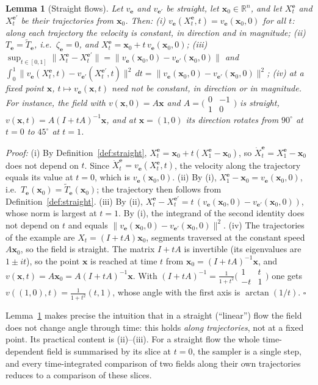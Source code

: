 \documentclass{article}
\newcommand{\RR}{\mathbb{R}}
\newcommand{\bx}{\mathbf{x}}
\newcommand{\be}{\mathbf{e}}                       %
\theoremstyle{plain}
\newtheorem{lemma}{Lemma}
\begin{document}
\begin{lemma}[Straight flows]\label{lem:straight}
Let $v_{\be}$ and $v_{\be'}$ be straight, let $\bx_0\in\RR^n$, and let $X^{\be}_t$ and $X^{\be'}_t$ be
their trajectories from $\bx_0$. Then:
(i) $v_{\be}(X^{\be}_t,t)=v_{\be}(\bx_0,0)$ for all $t$: along each trajectory the velocity is
constant, in direction and in magnitude;
(ii) $T_{\be}=\tilde T_{\be}$, i.e.\ $\zeta_{\be}=0$, and $X^{\be}_t=\bx_0+t\,v_{\be}(\bx_0,0)$;
(iii) $\sup_{t\in[0,1]}\|X^{\be}_t-X^{\be'}_t\|=\|v_{\be}(\bx_0,0)-v_{\be'}(\bx_0,0)\|$ and
$\int_0^1\|v_{\be}(X^{\be}_t,t)-v_{\be'}(X^{\be'}_t,t)\|^2\,dt=\|v_{\be}(\bx_0,0)-v_{\be'}(\bx_0,0)\|^2$;
(iv) at a fixed point $\bx$, $t\mapsto v_{\be}(\bx,t)$ need not be constant, in direction or in
magnitude. For instance, the field with $v(\bx,0)=A\bx$ and
$A=\big(\begin{smallmatrix}0&-1\\1&0\end{smallmatrix}\big)$ is straight, $v(\bx,t)=A(I+tA)^{-1}\bx$, and at
$\bx=(1,0)$ its direction rotates from $90^\circ$ at $t=0$ to $45^\circ$ at $t=1$.
\end{lemma}
\textit{Proof:}
(i) By Definition~\ref{def:straight}, $X^{\be}_t=\bx_0+t(X^{\be}_1-\bx_0)$, so
$\dot X^{\be}_t=X^{\be}_1-\bx_0$ does not depend on $t$. Since $\dot X^{\be}_t=v_{\be}(X^{\be}_t,t)$, the
velocity along the trajectory equals its value at $t=0$, which is $v_{\be}(\bx_0,0)$.
(ii) By (i), $X^{\be}_1-\bx_0=v_{\be}(\bx_0,0)$, i.e.\ $T_{\be}(\bx_0)=\tilde T_{\be}(\bx_0)$; the trajectory then
follows from Definition~\ref{def:straight}.
(iii) By (ii), $X^{\be}_t-X^{\be'}_t=t\,(v_{\be}(\bx_0,0)-v_{\be'}(\bx_0,0))$, whose norm is largest at $t=1$.
By (i), the integrand of the second identity does not depend on $t$ and equals
$\|v_{\be}(\bx_0,0)-v_{\be'}(\bx_0,0)\|^2$.
(iv) The trajectories of the example are $X_t=(I+tA)\bx_0$, segments traversed at the constant
speed $A\bx_0$, so the field is straight. The matrix $I+tA$ is invertible (its eigenvalues are
$1\pm it$), so the point $\bx$ is reached at time $t$ from $\bx_0=(I+tA)^{-1}\bx$, and
$v(\bx,t)=A\bx_0=A(I+tA)^{-1}\bx$. With
$(I+tA)^{-1}=\frac{1}{1+t^2}\big(\begin{smallmatrix}1&t\\-t&1\end{smallmatrix}\big)$ one gets
$v((1,0),t)=\frac{1}{1+t^2}(t,1)$, whose angle with the first axis is $\arctan(1/t)$.
\hfill $\square$

Lemma~\ref{lem:straight} makes precise the intuition that in a straight (``linear'') flow the
field does not change angle through time: this holds \emph{along trajectories}, not at a fixed
point. Its practical content is (ii)--(iii). For a straight flow the whole time-dependent field is
summarised by its slice at $t=0$, the sampler is a single step, and every time-integrated
comparison of two fields along their own trajectories reduces to a comparison of these slices.
\end{document}
